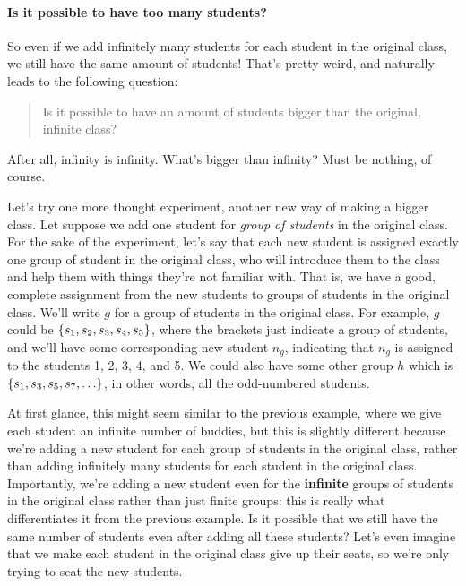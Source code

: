 \documentclass[10pt]{article}
\begin{document}
\paragraph{Is it possible to have too many students?}

So even if we add infinitely many students for each student in the original class, we still have the same amount of students!
That's pretty weird, and naturally leads to the following question:

\begin{quote}
    Is it possible to have an amount of students bigger than the original, infinite class?
\end{quote}

After all, infinity is infinity.
What's bigger than infinity?
Must be nothing, of course.

Let's try one more thought experiment, another new way of making a bigger class.
Let suppose we add one student for \emph{group of students} in the original class.
For the sake of the experiment, let's say that each new student is assigned exactly one group of student in the original class, who will introduce them to the class and help them with things they're not familiar with.
That is, we have a good, complete assignment from the new students to groups of students in the original class.
We'll write $g$ for a group of students in the original class.
For example, $g$ could be ${\left\{ {s_1, s_2, s_3, s_4, s_5} \right\}}$, where the brackets just indicate a group of students, and we'll have some corresponding new student $n_g$, indicating that $n_g$ is assigned to the students 1, 2, 3, 4, and 5.
We could also have some other group $h$ which is ${\left\{ {s_1, s_3, s_5, s_7, \ldots} \right\}}$, in other words, all the odd-numbered students.

At first glance, this might seem similar to the previous example, where we give each student an infinite number of buddies, but this is slightly different because we're adding a new student for each group of students in the original class, rather than adding infinitely many students for each student in the original class.
Importantly, we're adding a new student even for the \textbf{infinite} groups of students in the original class rather than just finite groups: this is really what differentiates it from the previous example.
Is it possible that we still have the same number of students even after adding all these students?
Let's even imagine that we make each student in the original class give up their seats, so we're only trying to seat the new students.
\end{document}
